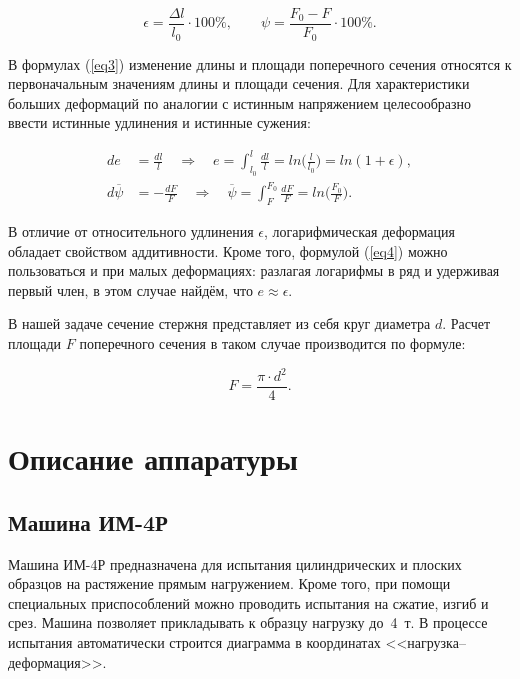 \documentclass[12pt, a4paper]{article}
\begin{document}
    \begin{equation}
        \epsilon = \frac{\Delta l}{l_{0}} \cdot 100 \%, \qquad
        \psi = \frac{F_{0} - F}{F_{0}} \cdot 100 \%.
        \label{eq3}
    \end{equation}
    
    В формулах (\ref{eq3}) изменение длины и площади поперечного сечения относятся к первоначальным значениям длины и площади сечения. Для характеристики больших деформаций по аналогии с истинным напряжением целесообразно ввести истинные удлинения и истинные сужения:
    
    \begin{equation}
        \begin{aligned}
            de &= \frac{dl}{l} \quad \Rightarrow \quad e = \int_{l_{0}}^{l} \frac{dl}{l} = ln \Big (\frac{l}{l_{0}} \Big ) = ln(1 + \epsilon), \\
            d\overline{\psi} &= -\frac{dF}{F} \quad \Rightarrow \quad \overline{\psi} = \int_{F}^{F_{0}} \frac{dF}{F} = ln \Big (\frac{F_{0}}{F} \Big ).
        \end{aligned}
        \label{eq4}
    \end{equation}
    
    В отличие от относительного удлинения $\epsilon$, логарифмическая деформация обладает свойством аддитивности. Кроме того, формулой (\ref{eq4}) можно пользоваться и при малых деформациях: разлагая логарифмы в ряд и удерживая первый член, в этом случае найдём, что $e \approx \epsilon$.
    
    В нашей задаче сечение стержня представляет из себя круг диаметра $d$. Расчет площади $F$ поперечного сечения в таком случае производится по формуле:
    
    \begin{equation}
        F = \frac{\pi \cdot d^{2}}{4}.
        \label{eq5}
    \end{equation}
    
    \newpage
    
    \section{Описание аппаратуры}
    
    \subsection{Машина ИМ-4Р}
    
    Машина ИМ-4Р предназначена для испытания цилиндрических и плоских образцов на растяжение прямым нагружением. Кроме того, при помощи специальных приспособлений можно проводить испытания на сжатие, изгиб и срез. Машина позволяет прикладывать к образцу нагрузку до 4~т. В процессе испытания автоматически строится диаграмма в координатах <<нагрузка–деформация>>.
    
\end{document}
